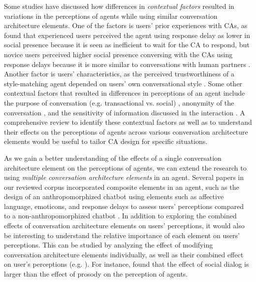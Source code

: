 Some studies have discussed how differences in \textit{contextual factors} resulted in variations in the perceptions of agents while using similar conversation architecture elements. One of the factors is users' prior experiences with CAs, as \citet{gnewuch2018faster}\cmt{[19]} found that experienced users perceived the agent using response delay as lower in social presence because it is seen as inefficient to wait for the CA to respond, but novice users perceived higher social presence conversing with the CAs using response delays because it is more similar to conversations with human partners \cite{gnewuch2018faster}\cmt{[19]}. Another factor is users' characteristics, as the perceived trustworthiness of a style-matching agent depended on users' own conversational style \cite{hoegen2019end}\cmt{[31]}. Some other contextual factors that resulted in differences in perceptions of an agent include the purpose of conversation (e.g. transactional vs. social) \cite{jeong2019exploring}\cmt{[10]}, anonymity of the conversation \cite{lee2020hear}\cmt{[23]}, and the sensitivity of information discussed in the interaction \cite{cox2022does}\cmt{[27]}. A comprehensive review to identify these contextual factors as well as to understand their effects on the perceptions of agents across various conversation architecture elements would be useful to tailor CA design for specific situations. 

As we gain a better understanding of the effects of a single conversation architecture element on the perceptions of agents, we can extend the research to using \textit{multiple conversation architecture elements} in an agent. Several papers in our reviewed corpus incorporated composite elements in an agent, such as the design of an anthropomorphized chatbot using elements such as affective language, emoticons, and response delays to assess users' perceptions compared to a non-anthropomorphized chatbot \cite{seeger2021chatbots}\cmt{[35]}. In addition to exploring the combined effects of conversation architecture elements on users' perceptions, it would also be interesting to understand the relative importance of each element on users' perceptions. This can be studied by analyzing the effect of modifying conversation architecture elements individually, as well as their combined effect on user's perceptions (e.g. \cite{habler2019effects, lubold2016effects, zhu2022effects}\cmt{[63][86][26]}). For instance, \citet{habler2019effects}\cmt{[63]} found that the effect of social dialog is larger than the effect of prosody on the perception of agents. 


